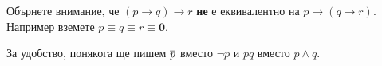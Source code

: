 \begin{remark}
  Обърнете внимание, че $(p\rightarrow q)\rightarrow r$ {\bf не} е еквивалентно на $p\rightarrow (q\rightarrow r)$.
  Например вземете $p \equiv q \equiv r \equiv \mathbf{0}$.
\end{remark}


    

  
\begin{remark}
  За удобство, понякога ще пишем $\overline{p}$ вместо $\neg p$ и $pq$ вместо $p \wedge q$.
\end{remark}


